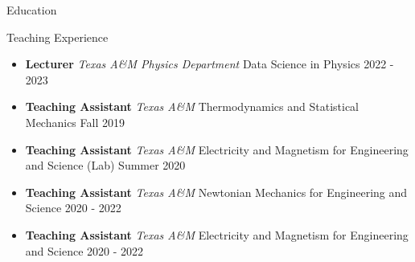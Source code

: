 \documentclass{resume}
\begin{document}
\begin{rSection}{Education}
\begin{rSection}{Teaching Experience}
    \begin{itemize}
        \item \textbf{Lecturer} {{\it Texas A\&M Physics Department} Data Science in Physics} \hfill 2022 - 2023
        \item \textbf{Teaching Assistant} {{\it Texas A\&M} Thermodynamics and Statistical Mechanics} \hfill Fall 2019
        \item \textbf{Teaching Assistant} {{\it Texas A\&M} Electricity and Magnetism for Engineering and Science (Lab)} \hfill Summer 2020
        \item \textbf{Teaching Assistant} {{\it Texas A\&M} Newtonian Mechanics for Engineering and Science} \hfill 2020 - 2022
        \item \textbf{Teaching Assistant} {{\it Texas A\&M} Electricity and Magnetism for Engineering and Science} \hfill 2020 - 2022
    \end{itemize}
\end{rSection}


\end{rSection}







\end{document}
